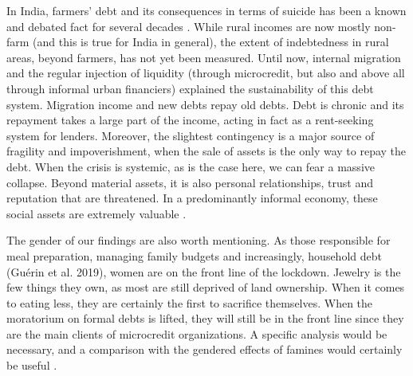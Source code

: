 \documentclass[a4paper, 11pt, onecolumn]{article}
\begin{document}
In India, farmers’ debt and its consequences in terms of suicide has been a known and debated fact for several decades \citep{Mohanty2005}. While rural incomes are now mostly non-farm (and this is true for India in general), the extent of indebtedness in rural areas, beyond farmers, has not yet been measured. Until now, internal migration and the regular injection of liquidity (through microcredit, but also and above all through informal urban financiers) explained the sustainability of this debt system. Migration income and new debts repay old debts. Debt is chronic and its repayment takes a large part of the income, acting in fact as a rent-seeking system for lenders. Moreover, the slightest contingency is a major source of fragility and impoverishment, when the sale of assets is the only way to repay the debt. When the crisis is systemic, as is the case here, we can fear a massive collapse. Beyond material assets, it is also personal relationships, trust and reputation that are threatened. In a predominantly informal economy, these social assets are extremely valuable \citep{Hart2000, Platteau1994}.


The gender of our findings are also worth mentioning. As those responsible for meal preparation, managing family budgets and increasingly, household debt (Guérin et al. 2019), women are on the front line of the lockdown. Jewelry is the few things they own, as most are still deprived of land ownership. When it comes to eating less, they are certainly the first to sacrifice themselves. When the moratorium on formal debts is lifted, they will still be in the front line since they are the main clients of microcredit organizations. A specific analysis would be necessary, and a comparison with the gendered effects of famines would certainly be useful \citep{Cliggett2005, Rangasami1986}. 
\end{document}
